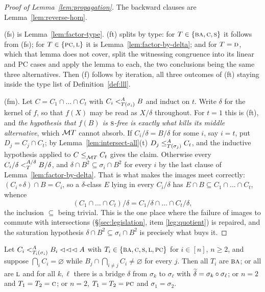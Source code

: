 \begin{proof}[Proof of Lemma~\ref{lem:propagation}]
The backward clauses are Lemma~\ref{lem:reverse-hom}.

(fs) is Lemma~\ref{lem:factor-type}. (ft) splits by type: for
$T\in\{\TBA,\TC,\TS\}$ it follows from (fs); for $T\in\{\TPC,\TL\}$ it is
Lemma~\ref{lem:factor-by-delta}; and for $T=\TD$, which that lemma does not
cover, split the witnessing congruence into its linear and PC cases and apply
the lemma to each, the two conclusions being the same three alternatives. Then
(f) follows by iteration, all three outcomes of (ft) staying inside the type
list of Definition~\ref{def:lll}.

(fm). Let $C=C_{1}\cap\dots\cap C_{t}$ with $C_{i}\subt[A]{T(\sigma_{i})}B$ and
induct on $t$. Write $\delta$ for the kernel of $f$, so that $f(X)$ may be read
as $X/\delta$ throughout. For $t=1$ this is (ft), and \emph{the hypothesis that
$f(B)$ is $\TS$-free is exactly what kills its middle alternative}, which
$\MT T$ cannot absorb. If $C_{i}/\delta=B/\delta$ for some $i$, say $i=t$, put
$D_{j}=C_{j}\cap C_{t}$; by Lemma~\ref{lem:intersect-all}(t)
$D_{j}\subte[A]{T(\sigma_{j})}C_{t}$, and the inductive hypothesis applied to
$C\subte{\MT T}C_{t}$ gives the claim. Otherwise every
$C_{i}/\delta\subt[A/\delta]{T}B/\delta$, and
$\delta\cap B^{2}\subseteq\sigma_{i}\cap B^{2}$ for every $i$ by the last clause
of Lemma~\ref{lem:factor-by-delta}. That is what makes the images meet
correctly: $(C_{i}\circ\delta)\cap B=C_{i}$, so a $\delta$-class $E$ lying in
every $C_{i}/\delta$ has $E\cap B\subseteq C_{1}\cap\dots\cap C_{t}$, whence
\[
  (C_{1}\cap\dots\cap C_{t})/\delta=C_{1}/\delta\cap\dots\cap C_{t}/\delta ,
\]
the inclusion $\subseteq$ being trivial. This is the one place where the failure
of images to commute with intersections (\S\ref{sec:legislation}, item
\ref{leg:quotient}) is repaired, and the saturation hypothesis
$\delta\cap B^{2}\subseteq\sigma_{i}\cap B^{2}$ is precisely what buys it.
\end{proof}

\begin{longtheorem}
Let $C_{i}\subt[A]{T_{i}(\sigma_{i})}B_{i}\lll A$ with
$T_{i}\in\{\TBA,\TC,\TS,\TL,\TPC\}$ for $i\in[n]$, $n\ge2$, and suppose
$\bigcap_{i}C_{i}=\varnothing$ while $B_{j}\cap\bigcap_{i\neq j}C_{i}\neq
\varnothing$ for every $j$. Then all $T_{i}$ are $\TBA$; or all are $\TL$ and
for all $k,\ell$ there is a bridge $\delta$ from $\sigma_{k}$ to $\sigma_{\ell}$
with $\bcol\delta=\sigma_{k}\circ\sigma_{\ell}$; or $n=2$ and
$T_{1}=T_{2}=\TC$; or $n=2$, $T_{1}=T_{2}=\TPC$ and $\sigma_{1}=\sigma_{2}$.
\end{longtheorem}


